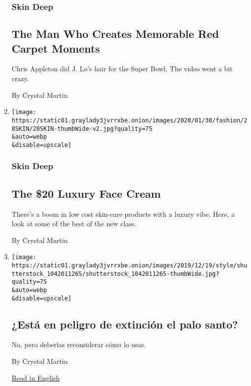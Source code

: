 \begin{enumerate}
  \hypertarget{skin-deep-3}{%
  \subsubsection{Skin Deep}\label{skin-deep-3}}

  \hypertarget{the-man-who-creates-memorable-red-carpet-moments}{%
  \subsection{The Man Who Creates Memorable Red Carpet
  Moments}\label{the-man-who-creates-memorable-red-carpet-moments}}

  Chris Appleton did J. Lo's hair for the Super Bowl. The video went a
  bit crazy.

  By Crystal Martin
\item
  \href{/2020/01/29/style/skin-care-beauty-the-20-luxury-face-cream.html}{}

  \texttt{[image: https://static01.graylady3jvrrxbe.onion/images/2020/01/30/fashion/28SKIN/28SKIN-thumbWide-v2.jpg?quality=75\\\&auto=webp\\\&disable=upscale]}

  \hypertarget{skin-deep-4}{%
  \subsubsection{Skin Deep}\label{skin-deep-4}}

  \hypertarget{the-20-luxury-face-cream}{%
  \subsection{The \$20 Luxury Face
  Cream}\label{the-20-luxury-face-cream}}

  There's a boom in low cost skin-care products with a luxury vibe.
  Here, a look at some of the best of the new class.

  By Crystal Martin
\item
  \href{/es/2019/12/23/espanol/palo-santo-peligro-de-extincion.html}{}

  \texttt{[image: https://static01.graylady3jvrrxbe.onion/images/2019/12/19/style/shutterstock\_1042011265/shutterstock\_1042011265-thumbWide.jpg?quality=75\\\&auto=webp\\\&disable=upscale]}

  \hypertarget{estuxe1-en-peligro-de-extinciuxf3n-el-palo-santo}{%
  \subsection{¿Está en peligro de extinción el palo
  santo?}\label{estuxe1-en-peligro-de-extinciuxf3n-el-palo-santo}}

  No, pero deberías reconsiderar cómo lo usas.

  By Crystal Martin

  \href{https://www.nytimes3xbfgragh.onion/2019/12/16/style/self-care/palo-santo-wood-endangered.html}{Read
  in English}
\end{enumerate}

